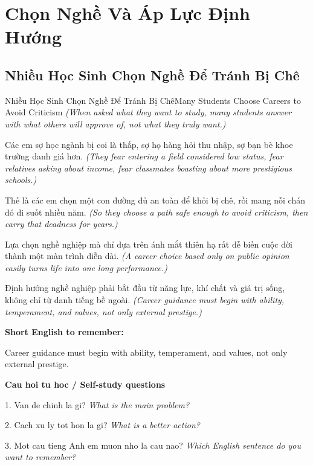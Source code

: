 \chapter{Chọn Nghề Và Áp Lực Định Hướng}

\section{Nhiều Học Sinh Chọn Nghề Để Tránh Bị Chê}
\begin{truyen}{Nhiều Học Sinh Chọn Nghề Để Tránh Bị Chê}{Many Students Choose Careers to Avoid Criticism}
\textit{(When asked what they want to study, many students answer with what others will approve of, not what they truly want.)}

Các em sợ học ngành bị coi là thấp, sợ họ hàng hỏi thu nhập, sợ bạn bè khoe trường danh giá hơn.
\textit{(They fear entering a field considered low status, fear relatives asking about income, fear classmates boasting about more prestigious schools.)}

Thế là các em chọn một con đường đủ an toàn để khỏi bị chê, rồi mang nỗi chán đó đi suốt nhiều năm.
\textit{(So they choose a path safe enough to avoid criticism, then carry that deadness for years.)}

Lựa chọn nghề nghiệp mà chỉ dựa trên ánh mắt thiên hạ rất dễ biến cuộc đời thành một màn trình diễn dài.
\textit{(A career choice based only on public opinion easily turns life into one long performance.)}

\end{truyen}

\begin{baihoc}
Định hướng nghề nghiệp phải bắt đầu từ năng lực, khí chất và giá trị sống, không chỉ từ danh tiếng bề ngoài.
\textit{(Career guidance must begin with ability, temperament, and values, not only external prestige.)}
\end{baihoc}

\begin{ghinhoanh}
\textbf{Short English to remember:}

Career guidance must begin with ability, temperament, and values, not only external prestige.

\end{ghinhoanh}

\begin{tuhocnhanh}
\textbf{Cau hoi tu hoc / Self-study questions}

1. Van de chinh la gi? \textit{What is the main problem?}

2. Cach xu ly tot hon la gi? \textit{What is a better action?}

3. Mot cau tieng Anh em muon nho la cau nao? \textit{Which English sentence do you want to remember?}
\end{tuhocnhanh}
\ngancach

